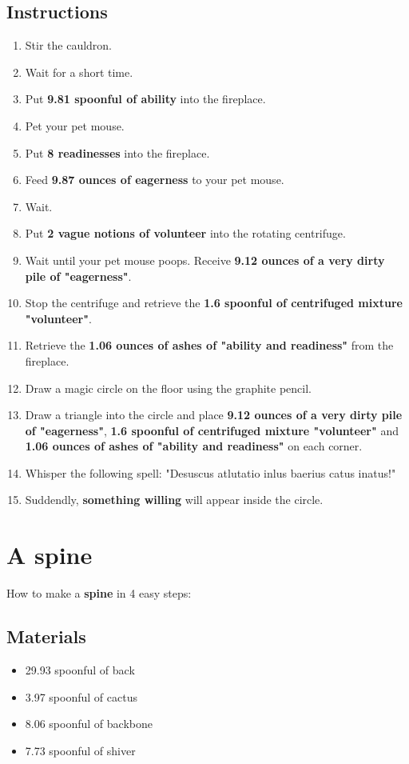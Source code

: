 \documentclass{article}
\begin{document}
\subsection{Instructions}\begin{enumerate}
\item 
Stir the cauldron.
\item 
Wait for a short time.
\item 
Put \textbf{9.81 spoonful of ability} into the fireplace.
\item 
Pet your pet mouse.
\item 
Put \textbf{8 readinesses} into the fireplace.
\item 
Feed \textbf{9.87 ounces of eagerness} to your pet mouse.
\item 
Wait.
\item 
Put \textbf{2 vague notions of volunteer} into the rotating centrifuge.
\item 
Wait until your pet mouse poops. Receive \textbf{9.12 ounces of a very dirty pile of "eagerness"}.
\item 
Stop the centrifuge and retrieve the \textbf{1.6 spoonful of centrifuged mixture "volunteer"}.
\item 
Retrieve the \textbf{1.06 ounces of ashes of "ability and readiness"} from the fireplace.
\item 
Draw a magic circle on the floor using the graphite pencil.
\item 
Draw a triangle into the circle and place \textbf{9.12 ounces of a very dirty pile of "eagerness"}, \textbf{1.6 spoonful of centrifuged mixture "volunteer"} and \textbf{1.06 ounces of ashes of "ability and readiness"} on each corner.
\item 
Whisper the following spell: "Desuscus atlutatio inlus baerius catus inatus!"
\item 
Suddendly, \textbf{something willing} will appear inside the circle.
\end{enumerate}
\newpage
\section{A spine}How to make a \textbf{spine} in 4 easy steps:

\subsection{Materials}\begin{itemize}
\item 
29.93 spoonful of back
\item 
3.97 spoonful of cactus
\item 
8.06 spoonful of backbone
\item 
7.73 spoonful of shiver
\end{itemize}
\end{document}
